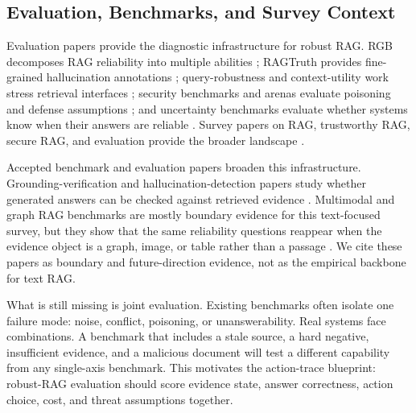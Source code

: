 \documentclass[11pt]{article}
\begin{document}
\subsection{Evaluation, Benchmarks, and Survey Context}

Evaluation papers provide the diagnostic infrastructure for robust RAG. RGB decomposes RAG reliability into multiple abilities \citep{rgb2023}; RAGTruth provides fine-grained hallucination annotations \citep{ragTruth2024}; query-robustness and context-utility work stress retrieval interfaces \citep{queryRobustness2025,rrag058}; security benchmarks and arenas evaluate poisoning and defense assumptions \citep{rrag019,rrag023,rrag035}; and uncertainty benchmarks evaluate whether systems know when their answers are reliable \citep{rrag001,rrag093}. Survey papers on RAG, trustworthy RAG, secure RAG, and evaluation provide the broader landscape \citep{ragSurvey2024,ragComprehensive2025,ragEvaluationSurvey2024,trustRAGCompass2024,trustworthyRAGSurvey2025,securityRAGSurvey2026,rrag134,rrag151}.

Accepted benchmark and evaluation papers broaden this infrastructure. Grounding-verification and hallucination-detection papers study whether generated answers can be checked against retrieved evidence \citep{venueAcc015,venueAcc020,venueAcc026}. Multimodal and graph RAG benchmarks are mostly boundary evidence for this text-focused survey, but they show that the same reliability questions reappear when the evidence object is a graph, image, or table rather than a passage \citep{venueAcc002,venueAcc004,venueAcc006,venueAcc019}. We cite these papers as boundary and future-direction evidence, not as the empirical backbone for text RAG.

What is still missing is joint evaluation. Existing benchmarks often isolate one failure mode: noise, conflict, poisoning, or unanswerability. Real systems face combinations. A benchmark that includes a stale source, a hard negative, insufficient evidence, and a malicious document will test a different capability from any single-axis benchmark. This motivates the action-trace blueprint: robust-RAG evaluation should score evidence state, answer correctness, action choice, cost, and threat assumptions together.

\end{document}
